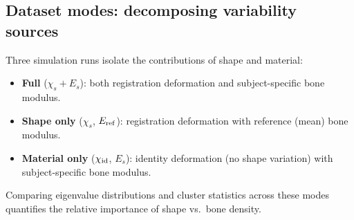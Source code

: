 \documentclass[11pt]{article}
\begin{document}
\subsection{Dataset modes: decomposing variability sources}
\label{sec:dataset-modes}
Three simulation runs isolate the contributions of shape and material:
\begin{itemize}[leftmargin=1.4em]
\item \textbf{Full} ($\chi_s + E_s$): both registration deformation and subject-specific bone modulus.
\item \textbf{Shape only} ($\chi_s$, $E_{\rm ref}$): registration deformation with reference (mean) bone modulus.
\item \textbf{Material only} ($\chi_{\rm id}$, $E_s$): identity deformation (no shape variation) with subject-specific bone modulus.
\end{itemize}
Comparing eigenvalue distributions and cluster statistics across these modes quantifies the relative importance of shape vs.\ bone density.

\end{document}
